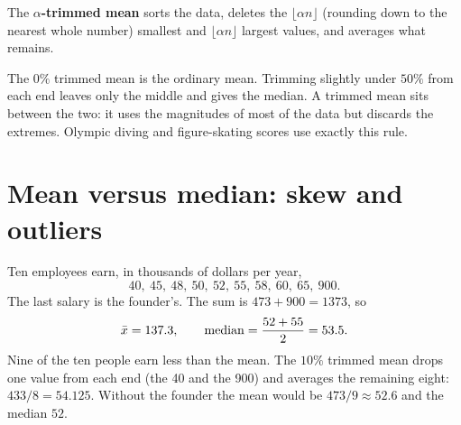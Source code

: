 \begin{definition}
The \textbf{$\alpha$-trimmed mean} sorts the data, deletes the $\lfloor \alpha n\rfloor$
(rounding down to the nearest whole number) smallest and $\lfloor \alpha n \rfloor$ largest values, and averages what remains.
\end{definition}

The $0\%$ trimmed mean is the ordinary mean. Trimming slightly under $50\%$ from each
end leaves only the middle and gives the median. A trimmed mean sits between the
two: it uses the magnitudes of most of the data but discards the extremes.
Olympic diving and figure-skating scores use exactly this rule.

\section{Mean versus median: skew and outliers}
\label{sec:center-spread-skew}

\begin{example}
Ten employees earn, in thousands of dollars per year,
\[
  40,\ 45,\ 48,\ 50,\ 52,\ 55,\ 58,\ 60,\ 65,\ 900.
\]
The last salary is the founder's. The sum is $473 + 900 = 1373$, so
\[
  \bar{x} = 137.3, \qquad \operatorname{median} = \frac{52+55}{2} = 53.5 .
\]
Nine of the ten people earn less than the mean. The $10\%$ trimmed mean drops one
value from each end (the 40 and the 900) and averages the remaining eight:
$433/8 = 54.125$. Without the founder the mean would be $473/9 \approx 52.6$ and
the median $52$.
\end{example}

